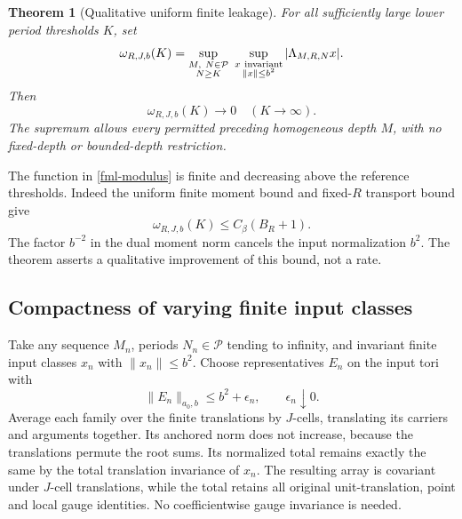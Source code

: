 \documentclass[11pt]{article}
\newtheorem{theorem}{Theorem}[section]
\theoremstyle{remark}
\begin{document}
\begin{theorem}[Qualitative uniform finite leakage]
\label{fml-theorem}
For all sufficiently large lower period thresholds \(K\), set
\begin{equation}
 \omega_{R,J,b}(K)
   =\sup_{\substack{M,\ N\in\mathcal P\\N\ge K}}
      \ \sup_{\substack{x\ {\rm invariant}\\\|x\|\le b^2}}
                     |\Lambda_{M,R,N}x|.
 \label{fml-modulus}
\end{equation}
Then
\begin{equation}
                         \omega_{R,J,b}(K)\longrightarrow0
                         \quad(K\longrightarrow\infty).
 \label{fml-vanishing}
\end{equation}
The supremum allows every permitted preceding homogeneous
depth \(M\), with no fixed-depth or bounded-depth restriction.
\end{theorem}

The function in \eqref{fml-modulus} is finite and decreasing
above the reference thresholds. Indeed the uniform finite
moment bound and fixed-\(R\) transport bound give
\begin{equation}
 \omega_{R,J,b}(K)\le C_\beta(B_R+1).
 \label{fml-crude-bound}
\end{equation}
The factor \(b^{-2}\) in the dual moment norm cancels the
input normalization \(b^2\). The theorem asserts a
qualitative improvement of this bound, not a rate.

\subsection{Compactness of varying finite input classes}
\label{fml-input-compactness}

Take any sequence \(M_n\), periods \(N_n\in\mathcal P\)
tending to infinity, and invariant finite input classes
\(x_n\) with \(\|x_n\|\le b^2\). Choose representatives
\(E_n\) on the input tori with
\begin{equation}
                         \|E_n\|_{a_0,b}\le b^2+\epsilon_n,
                         \qquad \epsilon_n\downarrow0.
 \label{fml-near-minimal}
\end{equation}
Average each family over the finite translations by
\(J\)-cells, translating its carriers and arguments
together. Its anchored norm does not increase, because
the translations permute the root sums. Its normalized
total remains exactly the same by the total translation
invariance of \(x_n\). The resulting array is covariant
under \(J\)-cell translations, while the total retains
all original unit-translation, point and local gauge
identities. No coefficientwise gauge invariance is needed.
\end{document}
